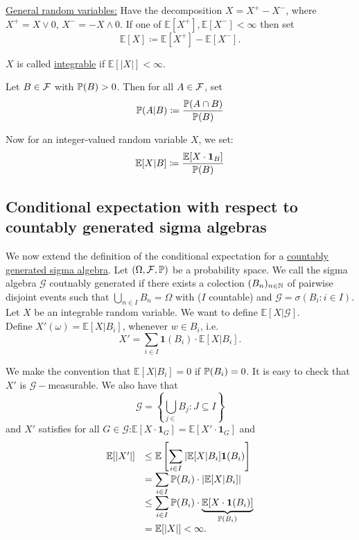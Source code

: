 \documentclass{article}
\begin{document}
\underline{General random variables:} Have the decomposition $ X = X^{+}-X^{-} $, where $ X^{+} = X\lor 0$, $X^{-}=-X\land 0 $. If one of $ \mathbb{E}[X^{+}], \mathbb{E}[X^{-}]  <\infty $ then set 
\[
	\mathbb{E}[X]\coloneqq \mathbb{E}[X^{+}]-\mathbb{E}[X^{-}].  
\]

\begin{boxdef}\label{def: integrable rv}
	$ X $ is called \underline{integrable} if $ \mathbb{E}[|X|]<\infty $.
\end{boxdef}

\begin{boxdef}\label{def: cond prob event}
Let $ B\in \mathcal{F} $ with $ \mathbb{P}(B)>0 $. Then for all $ A\in \mathcal{F} $, set 
\[
\mathbb{P}(A|B)\coloneqq \frac{\mathbb{P}(A\cap B)}{\mathbb{P}(B)}
\] 

\end{boxdef}


Now for an integer-valued random variable $ X $, we set:
\[
	\mathbb{E}[X|B]\coloneqq \frac{\mathbb{E}[X\cdot \mathbf{1}_{B}]}{\mathbb{P}(B)}
\]


\subsection{Conditional expectation with respect to countably generated sigma algebras}

We now extend the definition of the conditional expectation for a \underline{countably generated sigma algebra}. Let $ (\Omega, \mathcal{F}, \mathbb{P}) $ be a probability space. We call the sigma algebra $\mathcal{G} $ coutnably generated if there exists a colection $ (B_{n})_{n\in \mathbb{N}} $ of pairwise disjoint events such that $\displaystyle\bigcup_{n\in I}B_{n} = \Omega$ with ($ I $ countable) and $\mathcal{ G} = \sigma(B_{i}:i\in I)$.\\ 

Let $X$ be an integrable random variable. We want to define $\mathbb{E}[X|\mathcal{G}]$.\\ 

Define $X'(\omega) = \mathbb{E}[X|B_{i}]$, whenever $w\in B_{i}$, i.e. 
\[
	X' =\displaystyle\sum_{i\in I}\mathbf{1}(B_{i})\cdot\mathbb{E}[X|B_{i}]. 
\]

We make the convention that $\mathbb{E}[X|B_{i}] = 0$ if $\mathbb{P}(B_{i}) = 0$. It is easy to check that $X'$ is $\mathcal{G}-$measurable. We also have that 
\[
\mathcal{G}  = \left\{\displaystyle\bigcup_{j\in } B_{j}: J\subseteq I \right\}
\]
and $X'$ satisfies for all $ G\in\mathcal{G}$:$\mathbb{E}[X\cdot\mathbf{1}_{G}]=\mathbb{E}[X'\cdot\mathbf{1}_{G}] $ and 
\[\begin{array}{ll}
	\mathbb{E}[|X'|] &\leq\mathbb{E} \left[\displaystyle\sum_{i\in I}|\mathbb{E}[X|B_{i}]\mathbf{1}(B_{i})  \right] \\
			 &=\displaystyle\sum_{i \in I}\mathbb{P}(B_{i})\cdot \left|\mathbb{E}[X|B_{i}] \right|\\ 
			 &\leq\displaystyle\sum_{i\in I}\mathbb{P}(B_{i})\cdot \underbrace{\mathbb{E}[X\cdot\mathbf{1}(B_{i})]}_{\mathbb{P}(B_{i})}\\ 
			 &=\mathbb{E}[|X|]<\infty.
\end{array}
\]
\end{document}
